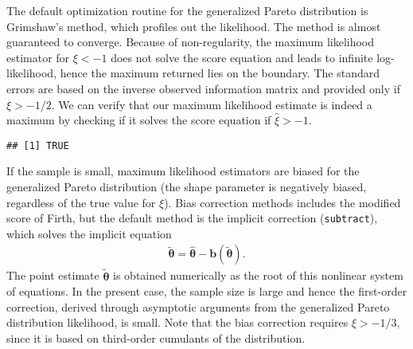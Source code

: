 \documentclass[]{book}
\newenvironment{Shaded}{\begin{snugshade}}{\end{snugshade}}
\newcommand{\CommentTok}[1]{\textcolor[rgb]{0.56,0.35,0.01}{\textit{#1}}}
\newcommand{\DataTypeTok}[1]{\textcolor[rgb]{0.13,0.29,0.53}{#1}}
\newcommand{\DecValTok}[1]{\textcolor[rgb]{0.00,0.00,0.81}{#1}}
\newcommand{\FloatTok}[1]{\textcolor[rgb]{0.00,0.00,0.81}{#1}}
\newcommand{\KeywordTok}[1]{\textcolor[rgb]{0.13,0.29,0.53}{\textbf{#1}}}
\newcommand{\NormalTok}[1]{#1}
\newcommand{\OperatorTok}[1]{\textcolor[rgb]{0.81,0.36,0.00}{\textbf{#1}}}
\newcommand{\StringTok}[1]{\textcolor[rgb]{0.31,0.60,0.02}{#1}}
\begin{document}
The default optimization routine for the generalized Pareto distribution is
Grimshaw's method, which profiles out the likelihood. The method is almost guaranteed to converge. Because of non-regularity, the maximum likelihood estimator for \(\xi < -1\) does not solve the score equation and leads to infinite log-likelihood, hence the maximum returned lies on the boundary. The standard errors are based on the inverse observed information matrix and provided only if \(\xi>-1/2\). We can verify that our maximum likelihood estimate is indeed a maximum by checking if it solves the score equation if \(\hat{\xi}>-1\).

\begin{Shaded}
\end{Shaded}

\begin{verbatim}
## [1] TRUE
\end{verbatim}

If the sample is small, maximum likelihood estimators are biased for the generalized Pareto distribution (the shape parameter is negatively biased, regardless of the true value for \(\xi\)). Bias correction methods includes the modified score of Firth, but the default method is the implicit correction (\texttt{subtract}), which solves the
implicit equation
\begin{align}
   \boldsymbol{\tilde{\theta}}=\hat{\boldsymbol{\theta}}-\boldsymbol{b}(\tilde{\boldsymbol{\theta}}). \label{eq:implbias}
\end{align}
The point estimate \(\boldsymbol{\tilde{\theta}}\) is obtained numerically as the root of this nonlinear system of
equations. In the present case, the sample size is large and hence the first-order correction, derived through asymptotic arguments from the generalized Pareto distribution likelihood, is small. Note that the bias correction requires \(\xi > -1/3\), since it is based on third-order cumulants of the distribution.

\begin{Shaded}
\end{Shaded}
\end{document}
